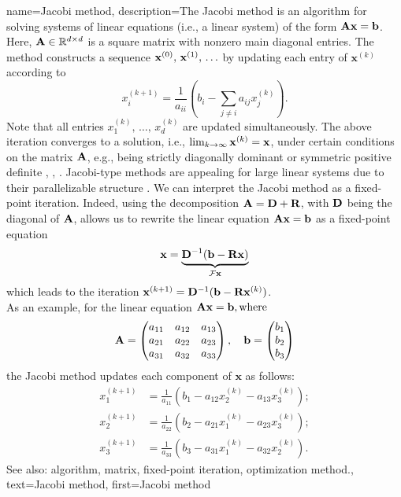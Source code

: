 {
{name={Jacobi method},
	description={The Jacobi method is an algorithm  
		for solving systems of linear equations (i.e., a linear system) of the form ${\bf A}{\bf x}= \mathbf{b}$.  
		Here, ${\bf A} \in \mathbb{R}^{d \times d}$ is a square matrix with 
		nonzero main diagonal entries. The method constructs a sequence ${\bf x}^{(0)}, \,{\bf x}^{(1)}, \,\ldots$ 
		by updating each entry of $\mathbf{x}^{(k)}$ according to 
		\[
		x_i^{(k+1)} = \frac{1}{a_{ii}} \left( b_i - \sum_{j \neq i} a_{ij} x_j^{(k)} \right).
		\]
		Note that all entries $x^{(k)}_{1}, \,\ldots, \,x^{(k)}_{d}$ are updated simultaneously.
		The above iteration converges to a solution, i.e., $\lim_{k \rightarrow \infty} {\bf x}^{(k)}={\bf x}$, 
		under certain conditions on the matrix ${\bf A}$, e.g., being strictly 
		diagonally dominant or symmetric positive  definite \cite{GolubVanLoanBook}, \cite{StrangLinAlg2016}, \cite{Horn91}. 
		Jacobi-type methods are appealing for large linear systems due to their parallelizable structure \cite{ParallelDistrBook}.
		We can interpret the Jacobi method as a fixed-point iteration. Indeed, using the decomposition ${\bf A} = {\bf D} + {\bf R}$, with ${\bf D}$ being the 
		diagonal of ${\bf A}$, allows us to rewrite the linear equation ${\bf A} {\bf x} = {\bf b}$ as a fixed-point equation  
		\[
		\mathbf{x} = \underbrace{{\bf D}^{-1}(\mathbf{b} - {\bf R} \mathbf{x})}_{\mathcal{F} {\bf x}}
		\]
		which leads to the iteration ${\bf x}^{(k+1)} = {\bf D}^{-1}(\mathbf{b} - {\bf R} {\bf x}^{(k)})$.
		\\
		As an example, for the linear equation ${\bf A} \mathbf{x} = \mathbf{b}, \text{where}$
		 \[
		 {\bf A} = \begin{pmatrix}
		 	a_{11} & a_{12} & a_{13} \\
		 	a_{21} & a_{22} & a_{23} \\
		 	a_{31} & a_{32} & a_{33}
		 \end{pmatrix}, \quad
		 \mathbf{b} = \begin{pmatrix}
		 	b_1 \\
		 	b_2 \\
		 	b_3
		 \end{pmatrix}
		 \]
		 the Jacobi method updates each component of \( \mathbf{x} \) as follows:
		 \[
		 \begin{aligned}
		 	x_1^{(k+1)} &= \frac{1}{a_{11}} \left( b_1 - a_{12} x_2^{(k)} - a_{13} x_3^{(k)} \right); \\
		 	x_2^{(k+1)} &= \frac{1}{a_{22}} \left( b_2 - a_{21} x_1^{(k)} - a_{23} x_3^{(k)} \right); \\
		 	x_3^{(k+1)} &= \frac{1}{a_{33}} \left( b_3 - a_{31} x_1^{(k)} - a_{32} x_2^{(k)} \right).
		 \end{aligned}
		 \]
		See also: algorithm, matrix, fixed-point iteration, optimization method.},
	text={Jacobi method}, 
	first={Jacobi method}
}
	
}
